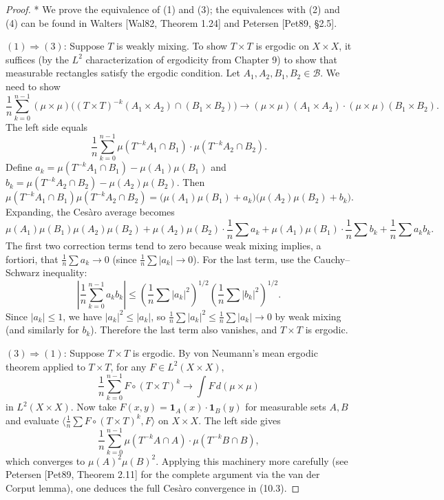 \begin{proof}
* We prove the equivalence of (1) and (3); the equivalences with (2) and (4) can be found in Walters [Wal82, Theorem 1.24] and Petersen [Pet89, §2.5].

$(1) \Rightarrow (3)$: Suppose $T$ is weakly mixing. To show $T \times T$ is ergodic on $X \times X$, it suffices (by the $L^2$ characterization of ergodicity from Chapter 9) to show that measurable rectangles satisfy the ergodic condition. Let $A_1, A_2, B_1, B_2 \in \mathcal{B}$. We need to show
\[
\frac{1}{n} \sum_{k=0}^{n-1} (\mu \times \mu)\bigl((T \times T)^{-k}(A_1 \times A_2) \cap (B_1 \times B_2)\bigr) \to (\mu \times \mu)(A_1 \times A_2) \cdot (\mu \times \mu)(B_1 \times B_2).
\]
The left side equals
\[
\frac{1}{n} \sum_{k=0}^{n-1} \mu(T^{-k}A_1 \cap B_1) \cdot \mu(T^{-k}A_2 \cap B_2).
\]
Define $a_k = \mu(T^{-k}A_1 \cap B_1) - \mu(A_1)\mu(B_1)$ and $b_k = \mu(T^{-k}A_2 \cap B_2) - \mu(A_2)\mu(B_2)$. Then
\[
\mu(T^{-k}A_1 \cap B_1)\mu(T^{-k}A_2 \cap B_2) = \bigl(\mu(A_1)\mu(B_1) + a_k\bigr)\bigl(\mu(A_2)\mu(B_2) + b_k\bigr).
\]
Expanding, the Cesàro average becomes
\[
\mu(A_1)\mu(B_1)\mu(A_2)\mu(B_2) + \mu(A_2)\mu(B_2) \cdot \frac{1}{n}\sum a_k + \mu(A_1)\mu(B_1) \cdot \frac{1}{n}\sum b_k + \frac{1}{n}\sum a_k b_k.
\]
The first two correction terms tend to zero because weak mixing implies, a fortiori, that $\frac{1}{n}\sum a_k \to 0$ (since $\frac{1}{n}\sum |a_k| \to 0$). For the last term, use the Cauchy--Schwarz inequality:
\[
\left|\frac{1}{n}\sum_{k=0}^{n-1} a_k b_k\right| \le \left(\frac{1}{n}\sum |a_k|^2\right)^{1/2}\left(\frac{1}{n}\sum |b_k|^2\right)^{1/2}.
\]
Since $|a_k| \le 1$, we have $|a_k|^2 \le |a_k|$, so $\frac{1}{n}\sum |a_k|^2 \le \frac{1}{n}\sum |a_k| \to 0$ by weak mixing (and similarly for $b_k$). Therefore the last term also vanishes, and $T \times T$ is ergodic.

$(3) \Rightarrow (1)$: Suppose $T \times T$ is ergodic. By von Neumann's mean ergodic theorem applied to $T \times T$, for any $F \in L^2(X \times X)$,
\[
\frac{1}{n}\sum_{k=0}^{n-1} F \circ (T \times T)^k \to \int F \, d(\mu \times \mu)
\]
in $L^2(X \times X)$. Now take $F(x,y) = \mathbf{1}_A(x) \cdot \mathbf{1}_B(y)$ for measurable sets $A, B$ and evaluate $\langle \frac{1}{n}\sum F \circ (T \times T)^k, F \rangle$ on $X \times X$. The left side gives
\[
\frac{1}{n}\sum_{k=0}^{n-1} \mu(T^{-k}A \cap A) \cdot \mu(T^{-k}B \cap B),
\]
which converges to $\mu(A)^2 \mu(B)^2$. Applying this machinery more carefully (see Petersen [Pet89, Theorem 2.11] for the complete argument via the van der Corput lemma), one deduces the full Cesàro convergence in (10.3).
\end{proof}



